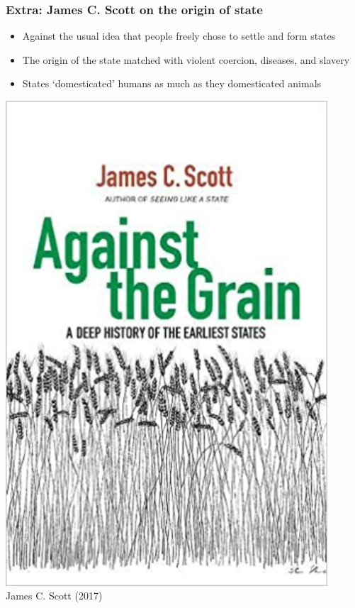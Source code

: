 \documentclass[aspectratio=43]{beamer}
\begin{document}
\begin{frame}
\frametitle{Extra: James C. Scott on the origin of state}
\centering

\begin{minipage}{0.6\textwidth}\centering
  \begin{itemize}
    \item Against the usual idea that people freely chose to settle and form states
    \item The origin of the state matched with violent coercion, diseases, and slavery
    \item States `domesticated' humans as much as they domesticated animals
  \end{itemize}
\end{minipage}\hfill
\begin{minipage}{0.39\textwidth}\centering
  \includegraphics[width = 0.9\textwidth]{img/scott_against}\\
  James C. Scott (2017)
\end{minipage}

\end{frame}
\end{document}
